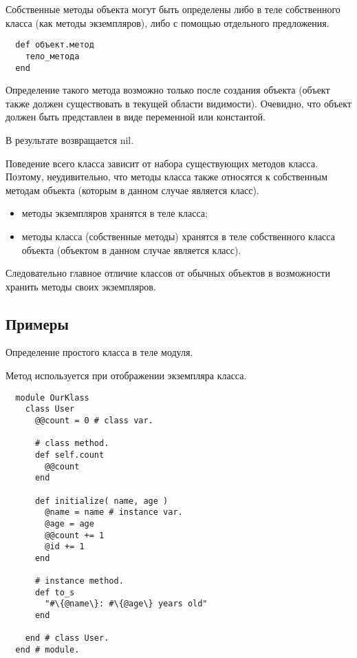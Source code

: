 Собственные методы объекта могут быть определены либо в теле собственного класса (как методы экземпляров), либо с помощью отдельного предложения.

\begin{verbatim}
  def объект.метод
    тело_метода
  end
\end{verbatim}

Определение такого метода возможно только после создания объекта (объект также должен существовать в текущей области видимости). Очевидно, что объект должен быть представлен в виде переменной или константой.

В результате возвращается nil.

Поведение всего класса зависит от набора существующих методов класса. Поэтому, неудивительно, что методы класса также относятся к собственным методам объекта (которым в данном случае является класс). 

\begin{itemize}
  \item методы экземпляров хранятся в теле класса;
  \item методы класса (собственные методы) хранятся в теле собственного класса объекта (объектом в данном случае является класс).
\end{itemize}

Следовательно главное отличие классов от обычных объектов в возможности хранить методы своих экземпляров.

\subsection{Примеры}

Определение простого класса в теле модуля.

Метод  используется при отображении экземпляра класса.

\begin{verbatim}
  module OurKlass
    class User
      @@count = 0 # class var.

      # class method.
      def self.count
        @@count
      end

      def initialize( name, age )
        @name = name # instance var.
        @age = age
        @@count += 1
        @id += 1
      end

      # instance method.
      def to_s
        "#\{@name\}: #\{@age\} years old"
      end

    end # class User.
  end # module.
\end{verbatim}

